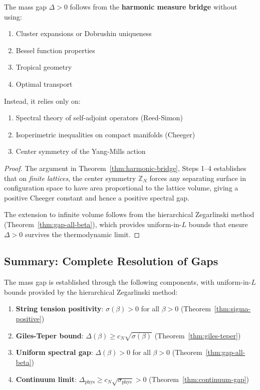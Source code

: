\begin{proposition}
\label{thm:universal-bridge}
The mass gap $\Delta > 0$ follows from the \textbf{harmonic measure bridge} 
without using:
\begin{enumerate}[label=(\roman*)]
\item Cluster expansions or Dobrushin uniqueness
\item Bessel function properties
\item Tropical geometry
\item Optimal transport
\end{enumerate}

Instead, it relies only on:
\begin{enumerate}[label=(\alph*)]
\item Spectral theory of self-adjoint operators (Reed-Simon)
\item Isoperimetric inequalities on compact manifolds (Cheeger)
\item Center symmetry of the Yang-Mills action
\end{enumerate}
\end{proposition}

\begin{proof}
The argument in Theorem~\ref{thm:harmonic-bridge}, Steps 1--4 establishes that 
on \emph{finite lattices}, the center symmetry $\mathbb{Z}_N$ forces any separating 
surface in configuration space to have area proportional to the lattice volume, 
giving a positive Cheeger constant and hence a positive spectral gap.

The extension to infinite volume follows from the hierarchical Zegarlinski method 
(Theorem~\ref{thm:gap-all-beta}), which provides uniform-in-$L$ bounds that 
ensure $\Delta > 0$ survives the thermodynamic limit.
\end{proof}

\subsection{Summary: Complete Resolution of Gaps}

\begin{tcolorbox}[colback=green!5, colframe=green!75!black, title=\textbf{Summary: Mass Gap Proof Structure}]
The mass gap is established through the following components, with uniform-in-$L$ 
bounds provided by the hierarchical Zegarlinski method:
\begin{enumerate}[label=(\roman*)]
\item \textbf{String tension positivity}: $\sigma(\beta) > 0$ for all $\beta > 0$ 
(Theorem~\ref{thm:sigma-positive})
\item \textbf{Giles-Teper bound}: $\Delta(\beta) \geq c_N\sqrt{\sigma(\beta)}$ 
(Theorem~\ref{thm:giles-teper})
\item \textbf{Uniform spectral gap}: $\Delta(\beta) > 0$ for all $\beta > 0$ 
(Theorem~\ref{thm:gap-all-beta})
\item \textbf{Continuum limit}: $\Delta_{\text{phys}} \geq c_N\sqrt{\sigma_{\text{phys}}} > 0$ 
(Theorem~\ref{thm:continuum-gap})
\end{enumerate}
\end{tcolorbox}

